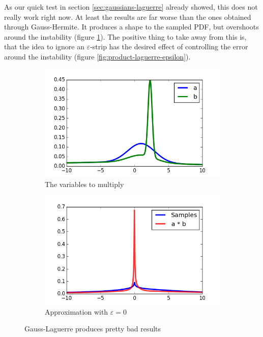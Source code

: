 \documentclass[11pt,a4paper]{book}
\begin{document}
As our quick test in section \ref{sec:gaussians-laguerre} already showed, this
does not really work right now. At least the results are far worse than the ones
obtained through Gauss-Hermite. It produces a shape to the sampled PDF, but
overshoots around the instability (figure \ref{fig:product-laguerre}). The
positive thing to take away from this is, that the idea to ignore an
$\varepsilon$-strip has the desired effect of controlling the error around the
instability (figure \ref{fig:product-laguerre-epsilon}).
\begin{figure}[h]
  \centering
  \begin{subfigure}[t]{0.45\textwidth}
    \centering
    \includegraphics[width=\textwidth]{thesis/operations/product-laguerre-vars}
    \caption{The variables to multiply}
  \end{subfigure}
  \hfill
  \begin{subfigure}[t]{0.45\textwidth}
    \centering
    \includegraphics[width=\textwidth]{thesis/operations/product-laguerre-0}
    \caption{Approximation with $\varepsilon = 0$}
  \end{subfigure}
  \caption{Gauss-Laguerre produces pretty bad results}
  \label{fig:product-laguerre}
\end{figure}
\end{document}
